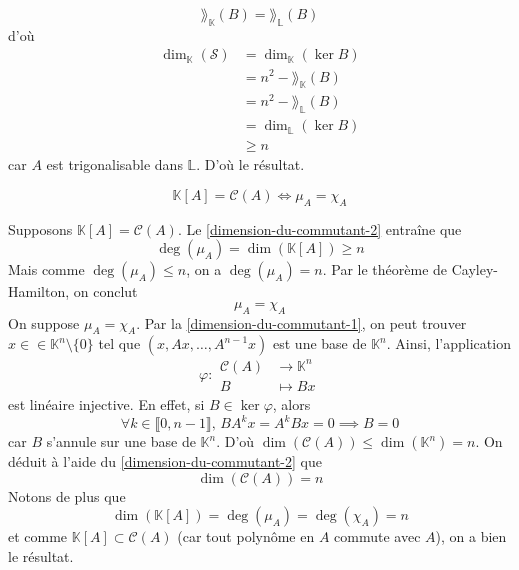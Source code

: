 \begin{demonstration}
		\[ \rang_{\mathbb{K}}(B) = \rang_{\mathbb{L}}(B) \]
		d'où
		\begin{align*}
			\dim_{\mathbb{K}}(\mathcal{S}) &= \dim_{\mathbb{K}}(\ker{B}) \\
			&= n^2 - \rang_{\mathbb{K}}(B) \\
			&= n^2 - \rang_{\mathbb{L}}(B) \\
			&= \dim_{\mathbb{L}}(\ker{B}) \\
			&\geq n
		\end{align*}
		car $A$ est trigonalisable dans $\mathbb{L}$. D'où le résultat.
	\end{demonstration}

	\begin{theorem}
		\[ \mathbb{K}[A] = \mathcal{C}(A) \iff \mu_A = \chi_A \]
	\end{theorem}

	\begin{demonstration}
		 Supposons $\mathbb{K}[A] = \mathcal{C}(A)$. Le \cref{dimension-du-commutant-2} entraîne que
		\[ \deg(\mu_A) = \dim(\mathbb{K}[A]) \geq n \]
		Mais comme $\deg(\mu_A) \leq n$, on a $\deg(\mu_A) = n$. Par le théorème de Cayley-Hamilton, on conclut
		\[ \mu_A = \chi_A \]
		 On suppose $\mu_A = \chi_A$. Par la \cref{dimension-du-commutant-1}, on peut trouver $x \in \in \mathbb{K}^n \setminus \{ 0 \}$ tel que $(x, Ax, \dots, A^{n-1}x)$ est une base de $\mathbb{K}^n$. Ainsi, l'application
		\[ \varphi :
		\begin{array}{cl}
			\mathcal{C}(A) &\rightarrow \mathbb{K}^n \\
			B &\mapsto Bx
		\end{array}
		\]
		est linéaire injective. En effet, si $B \in \ker{\varphi}$, alors
		\[ \forall k \in \llbracket 0, n-1 \rrbracket, \, BA^kx = A^kBx = 0 \implies B = 0 \]
		car $B$ s'annule sur une base de $\mathbb{K}^n$. D'où $\dim(\mathcal{C}(A)) \leq \dim(\mathbb{K}^n) = n$. On déduit à l'aide du \cref{dimension-du-commutant-2} que
		\[ \dim(\mathcal{C}(A)) = n \]
		Notons de plus que
		\[ \dim(\mathbb{K}[A]) = \deg(\mu_A) = \deg(\chi_A) = n \]
		et comme $\mathbb{K}[A] \subset \mathcal{C}(A)$ (car tout polynôme en $A$ commute avec $A$), on a bien le résultat.
	\end{demonstration}

